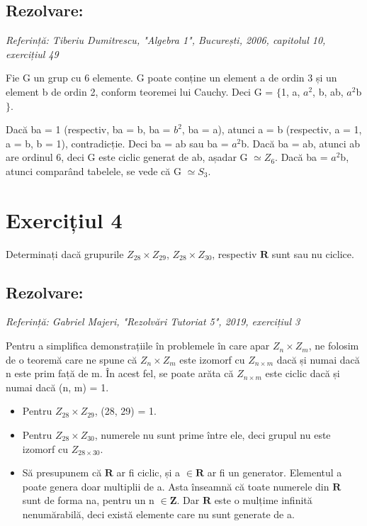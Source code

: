 \documentclass{article}
\begin{document}
\subsection{Rezolvare:}
\begin {small}
\emph{Referință: Tiberiu Dumitrescu, "Algebra 1", București, 2006, capitolul 10, exercițiul 49}
\end {small}

Fie G un grup cu 6 elemente. G poate conține un element a de ordin 3 și un element b de ordin 2, conform teoremei lui Cauchy. Deci G = $\{$1, a, $a^2$, b, ab, $a^2$b$\}$.

Dacă ba = 1 (respectiv, ba = b, ba = $b^2$, ba = a), atunci a = b (respectiv, a = 1, a = b, b = 1), contradicție. Deci ba = ab sau ba = $a^2$b. Dacă ba = ab, atunci
ab are ordinul 6, deci G este ciclic generat de ab, așadar G $\simeq Z_6$.
Dacă ba = $a^2$b, atunci comparând tabelele, se vede că G $\simeq S_3$.

\section{Exercițiul 4}
Determinați dacă grupurile $Z_{28} \times Z_{29}$, $Z_{28} \times Z_{30}$, respectiv $\mathbf{R}$ sunt sau nu ciclice.

\subsection{Rezolvare:}
\begin {small}
\emph{Referință: Gabriel Majeri, "Rezolvări Tutoriat 5", 2019, exercițiul 3}
\end {small}

Pentru a simplifica demonstrațiile în problemele în care apar 
$Z_{n} \times Z_{m}$, ne folosim de o teoremă care ne spune că $Z_{n} \times Z_{m}$ este izomorf cu $Z_{n \times m}$ dacă și numai dacă n este prim față de m. În acest fel, se poate arăta că $Z_{n \times m}$ este ciclic dacă și numai dacă (n, m) = 1.
\begin{itemize}
    \item Pentru $Z_{28} \times Z_{29}$, (28, 29) = 1.
    \item Pentru $Z_{28} \times Z_{30}$, numerele nu sunt prime între ele, deci grupul nu este izomorf cu $Z_{28 \times 30}$.
    \item Să presupunem că $\mathbf{R}$ ar fi ciclic, și a $ \in \mathbf{R}$ ar fi un generator. Elementul a poate genera doar multiplii de a. Asta înseamnă că toate numerele din $\mathbf{R}$ sunt de forma na, pentru un n $\in \mathbf{Z}$. Dar $\mathbf{R}$ este o mulțime infinită nenumărabilă, deci există elemente care nu sunt generate de a.
\end{itemize}
\end{document}
